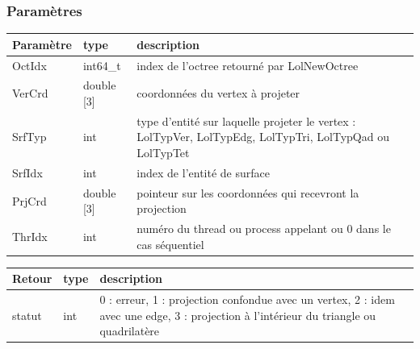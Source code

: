 \documentclass[a4paper,12pt]{article}
\begin{document}
\subsubsection*{Paramètres}
\begin{tabular}{|m{3cm}|m{2cm}|m{8.5cm}|}
\hline
Paramètre  & type       & description \\
\hline
OctIdx     & int64\_t   & index de l'octree retourné par LolNewOctree \\
\hline
VerCrd     & double [3] & coordonnées du vertex à projeter \\
\hline
SrfTyp     & int        & type d'entité sur laquelle projeter le vertex : LolTypVer, LolTypEdg, LolTypTri, LolTypQad ou LolTypTet \\
\hline
SrfIdx     & int        & index de l'entité de surface \\
\hline
PrjCrd     & double [3] & pointeur sur les coordonnées qui recevront la projection \\
\hline
ThrIdx     & int        & numéro du thread ou process appelant ou 0 dans le cas séquentiel \\
\hline
\end{tabular}

\medskip

\begin{tabular}{|m{3cm}|m{2cm}|m{8.5cm}|}
\hline
Retour     & type   & description \\
\hline
statut     & int    & 0 : erreur, 1 : projection confondue avec un vertex, 2 : idem avec une edge, 3 : projection à l'intérieur du triangle ou quadrilatère \\
\hline
\end{tabular}
\end{document}
